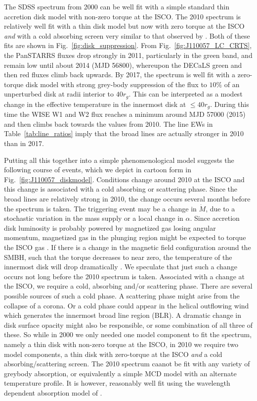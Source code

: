 \documentclass[a4paper,fleqn,usenatbib]{mnras}
\begin{document}
The SDSS spectrum from 2000 can be well fit with a simple standard thin accretion disk model with non-zero torque at the ISCO. The 2010 spectrum is relatively well fit with a thin disk model but now with zero torque at the ISCO \emph{and} with a cold absorbing screen very similar to that observed by \citep{Guo2016}. Both of these fits are shown in Fig.~\ref{fig:disk_suppression}. From Fig.~\ref{fig:J110057_LC_CRTS}, the PanSTARRS fluxes drop strongly in 2011, particularly in the green band, and remain low until about 2014 (MJD 56800), whereupon the DECaLS green and then red fluxes climb back upwards. By 2017, the spectrum is well fit with a zero-torque disk model with strong grey-body suppression of the flux to $10\%$ of an unperturbed disk at radii interior to $40r_{g}$. This can be interpreted as a modest change in the effective temperature in the innermost disk at $\leq 40r_{g}$. During this time the WISE W1 and W2 flux reaches a minimum around MJD 57000 (2015) and then climbs back towards the values from 2010. The line EWs in Table~\ref{tab:line_ratios} imply that the broad lines are actually stronger in 2010 than in 2017. 

Putting all this together into a simple phenomenological model suggests the following course of events, which we depict in cartoon form in  Fig.~\ref{fig:J110057_diskmodel}.  Conditions change around 2010 at the ISCO and this change is associated with a cold absorbing or scattering phase. Since the broad lines are relatively strong in 2010, the change occurs several months before the spectrum is taken. The triggering event may be a change in $\dot{M}$, due to a stochastic variation in the mass supply or a local change in $\alpha$. Since accretion disk luminosity is probably powered by magnetized gas losing angular momentum, magnetized gas in the plunging region might be expected to torque the ISCO gas \citet[e.g., ][]{Gammie1999,Agol_Krolik2000}. If there is a change in the magnetic field configuration around the SMBH, such that the torque decreases to near zero, the temperature of the innermost disk will drop dramatically \citep{Cao2003}.  We speculate that just such a change occurs not long before the 2010 spectrum is taken. Associated with a change at the ISCO, we require a cold, absorbing and/or scattering phase. There are several possible sources of such a cold phase. A scattering phase might arise from the collapse of a corona. Or a cold phase could appear in the helical outflowing wind which generates the innermost broad line region (BLR). A dramatic change in disk surface opacity might also be responsible, or some combination of all three of these. So while in 2000 we only needed one model component to fit the spectrum, namely a thin disk with non-zero torque at the ISCO, in 2010 we require two model components, a thin disk with zero-torque at the ISCO \emph{and} a cold absorbing/scattering screen. The 2010 spectrum caanot be fit with any variety of greybody absorption, or equivalently a simple MCD model with an alternate temperature profile. It is however, reasonably well fit using the wavelength dependent absorption model of \citep{Guo_2016}.
\end{document}
